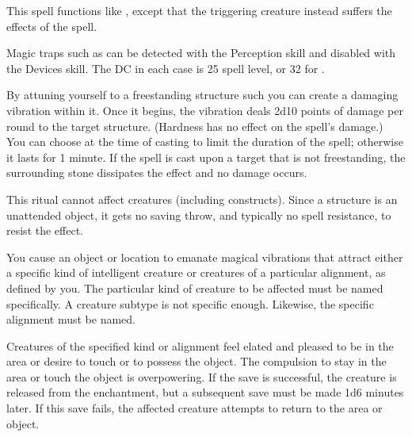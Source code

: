 \begin{spelleffect}
This spell functions like , except that the triggering creature instead suffers the effects of the  spell.
\end{spelleffect}
\begin{spellnotes}
Magic traps such as  can be detected with the Perception skill and disabled with the Devices skill. The DC in each case is 25 \add spell level, or 32 for .
\end{spellnotes}

\begin{spelleffect}
By attuning yourself to a freestanding structure such you can create a damaging vibration within it. Once it begins, the vibration deals 2d10 points of damage per round to the target structure. (Hardness has no effect on the spell's damage.) You can choose at the time of casting to limit the duration of the spell; otherwise it lasts for 1 minute. If the spell is cast upon a target that is not freestanding, the surrounding stone dissipates the effect and no damage occurs.
\end{spelleffect}
\begin{spellnotes}
This ritual cannot affect creatures (including constructs). Since a structure is an unattended object, it gets no saving throw, and typically no spell resistance, to resist the effect.
\end{spellnotes}

\spellrng{\rngclose}
\begin{spelleffect}
You cause an object or location to emanate magical vibrations that attract either a specific kind of intelligent creature or creatures of a particular alignment, as defined by you. The particular kind of creature to be affected must be named specifically. A creature subtype is not specific enough. Likewise, the specific alignment must be named.
\par Creatures of the specified kind or alignment feel elated and pleased to be in the area or desire to touch or to possess the object. The compulsion to stay in the area or touch the object is overpowering. If the save is successful, the creature is released from the enchantment, but a subsequent save must be made 1d6 minutes later. If this save fails, the affected creature attempts to return to the area or object.
\end{spelleffect}

